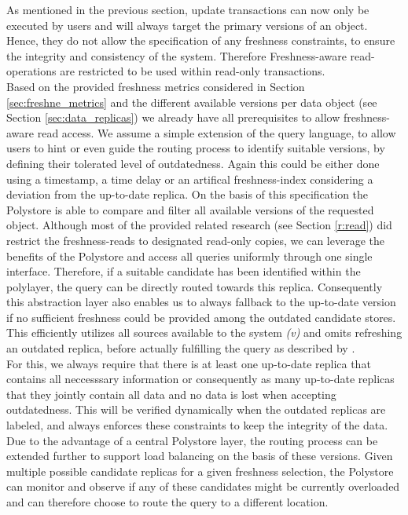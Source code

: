 As mentioned in the previous section, update transactions can now only be executed by users and will always target the primary versions of an object.
Hence, they do not allow the specification of any freshness constraints, to ensure the integrity and consistency of the system.
Therefore Freshness-aware read-operations are restricted to be used within read-only transactions.\\
Based on the provided freshness metrics considered in Section \ref{sec:freshne_metrics} and the different available versions per data object (see Section \ref{sec:data_replicas})
we already have all prerequisites to allow freshness-aware read access. 
We assume a simple extension of the query language, to allow users to hint or even guide the routing process to identify suitable versions, 
by defining their tolerated level of outdatedness.
Again this could be either done using a timestamp, a time delay or an artifical freshness-index considering a deviation from the up-to-date replica.
On the basis of this specification the Polystore is able to compare and filter all available versions of the requested object.
Although most of the provided related research (see Section \ref{r:read}) did restrict the freshness-reads to designated read-only copies, we can leverage the benefits 
of the Polystore and access all queries uniformly through one single interface. Therefore, if a suitable candidate has been identified within the polylayer, 
the query can be directly routed towards this replica. Consequently this abstraction layer also enables us to always fallback to the up-to-date version
if no sufficient freshness could be provided among the outdated candidate stores. This efficiently utilizes all sources available to the system \textit{(v)}
and omits refreshing an outdated replica, before actually fulfilling the query as described by \cite{voicu:2010}.\\
For this, we always require that there is at least one up-to-date replica that contains all neccesssary information or consequently as many up-to-date replicas 
that they jointly contain all data and no data is lost when accepting outdatedness.
This will be verified dynamically when the outdated replicas are labeled, and always enforces these constraints to keep the integrity of the data.
Due to the advantage of a central Polystore layer, the routing process can be extended further to support load balancing on the basis of these versions. 
Given multiple possible candidate replicas for a given freshness selection, the Polystore can monitor and observe 
if any of these candidates might be currently overloaded and can therefore choose to route the query to a different location.
